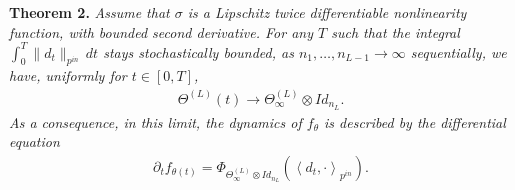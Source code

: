 \documentclass[10pt]{article}
\newcommand{\inner}[2]{\left\langle #1, #2 \right\rangle}
\newcommand{\paran}[1]{{( #1 )}}
\newcommand{\pin}{{p^{in}}}
\begin{document}
\textbf{Theorem 2.} \textit{Assume that $\sigma$ is a Lipschitz twice differentiable nonlinearity function, with bounded second derivative. For any $T$ such that the integral $\int_0^T \|d_t\|_\pin \, dt$ stays stochastically bounded, as $n_1, \ldots, n_{L - 1} \rightarrow \infty$ sequentially, we have, uniformly for $t \in [0,T]$,
\begin{align*}
\Theta^\paran{L}(t) \rightarrow \Theta^\paran{L}_\infty \otimes Id_{n_L}.
\end{align*}
As a consequence, in this limit, the dynamics of $f_\theta$ is described by the differential equation
\begin{align*}
\partial_t f_{\theta(t)} = \Phi_{\Theta^\paran{L}_\infty \otimes Id_{n_L}} \left( \inner{d_t}{\cdot}_\pin \right).
\end{align*}}
\end{document}
